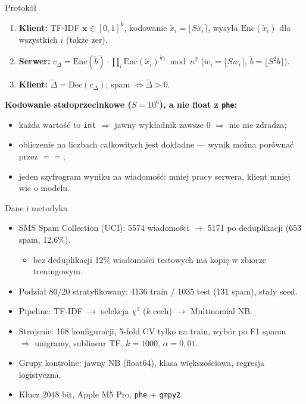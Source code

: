 \documentclass[aspectratio=169,11pt]{beamer}
\begin{document}
\begin{frame}{Protokół}
  \begin{enumerate}
    \item \textbf{Klient:} TF-IDF $\mathbf{x} \in [0,1]^k$, kodowanie $\tilde{x}_i = \lfloor S x_i \rceil$, wysyła $\mathrm{Enc}(\tilde{x}_i)$ dla \alert{wszystkich} $i$ (także zer).
    \item \textbf{Serwer:} $c_\Delta = \mathrm{Enc}(\tilde{b}) \cdot \prod_i \mathrm{Enc}(\tilde{x}_i)^{\tilde{w}_i} \bmod n^2$ \quad ($\tilde{w}_i = \lfloor S w_i \rceil$, $\tilde{b} = \lfloor S^2 b \rceil$).
    \item \textbf{Klient:} $\tilde{\Delta} = \mathrm{Dec}(c_\Delta)$; spam $\Leftrightarrow \tilde{\Delta} > 0$.
  \end{enumerate}
  \vspace{0.5em}
  \textbf{Kodowanie stałoprzecinkowe ($S = 10^6$), a nie float z \texttt{phe}:}
  \begin{itemize}
    \item każda wartość to \texttt{int} $\Rightarrow$ jawny wykładnik zawsze $0$ $\Rightarrow$ nic nie zdradza;
    \item obliczenie na liczbach całkowitych jest \alert{dokładne} --- wynik można porównać przez $==$;
    \item jeden szyfrogram wyniku na wiadomość: mniej pracy serwera, klient mniej wie o modelu.
  \end{itemize}
\end{frame}

\begin{frame}{Dane i metodyka}
  \begin{itemize}
    \item SMS Spam Collection (UCI): 5574 wiadomości $\to$ \alert{5171 po deduplikacji} (653 spam, 12,6\%).
    \begin{itemize}
      \item bez deduplikacji 12\% wiadomości testowych ma kopię w zbiorze treningowym.
    \end{itemize}
    \item Podział 80/20 stratyfikowany: 4136 train / 1035 test (131 spam), stały seed.
    \item Pipeline: TF-IDF $\to$ selekcja $\chi^2$ ($k$ cech) $\to$ Multinomial NB.
    \item Strojenie: 168 konfiguracji, 5-fold CV \alert{tylko na train}, wybór po F1 spamu \\
      $\Rightarrow$ unigramy, sublinear TF, $k = 1000$, $\alpha = 0{,}01$.
    \item Grupy kontrolne: jawny NB (float64), klasa większościowa, regresja logistyczna.
    \item Klucz 2048 bit, Apple M5 Pro, \texttt{phe} + \texttt{gmpy2}.
  \end{itemize}
\end{frame}
\end{document}
